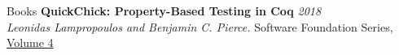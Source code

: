 \documentclass{resume} %
\begin{document}
\newcommand{\pub}[4]{
  {\bf #1} \hfill {\href{https://lemonidas.github.io/pdf/#2}{\bf \em #4}}\\
  {#3}
  }

\newcommand{\pubsub}[5]{
  {\bf #1:} \hfill {\href{https://lemonidas.github.io/pdf/#2}{\bf \em #4}}\\
  {\bf #5}\\
  {#3}
  }

\begin{rSection}{Books}
  {\bf QuickChick: Property-Based Testing in Coq} \hfill {\em 2018}\\
  {\em Leonidas Lampropoulos and Benjamin C. Pierce.}
  {Software Foundation Series, \href{https://softwarefoundations.cis.upenn.edu}{Volume 4}}

\end{rSection}
\end{document}
